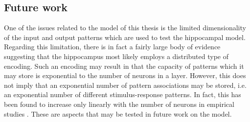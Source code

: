





\subsection*{Future work}


One of the issues related to the model of this thesis is the limited dimensionality of the input and output patterns which are used to test the hippocampal model. Regarding this limitation, there is in fact a fairly large body of evidence suggesting that the hippocampus most likely employs a distributed type of encoding. Such an encoding may result in that the capacity of patterns which it may store is exponential to the number of neurons in a layer.
However, this does not imply that an exponential number of pattern associations may be stored, i.e. an exponential number of different stimulus-response patterns. In fact, this has been found to increase only linearly with the number of neurons in empirical studies \citep{Rolls1998chpt6}. These are aspects that may be tested in future work on the model.

